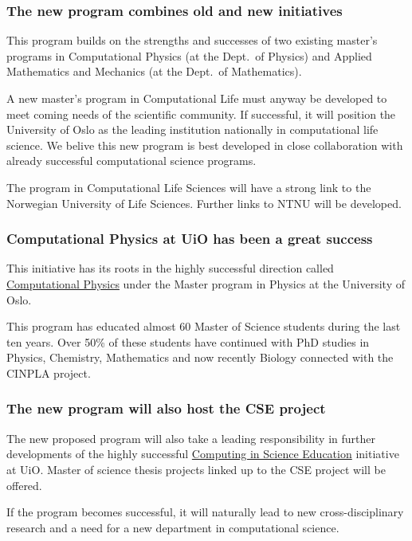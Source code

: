 \documentclass{beamer}
\begin{document}
\begin{frame}
\frametitle{The new program combines old and new initiatives}

\begin{block}{}

This program builds on the strengths and successes of two existing master's
programs in Computational Physics (at the Dept.~of Physics) and
Applied Mathematics and Mechanics (at the Dept.~of Mathematics).

A new master's program in Computational Life must anyway be developed to
meet coming needs of the scientific community. If successful, it will
position the University of Oslo as the leading institution
nationally in computational life science. We belive this new program is
best developed in close collaboration with already successful
computational science programs.

The program in Computational Life Sciences will have a strong
link to the Norwegian University of Life Sciences. Further links to
NTNU will be developed.
\end{block}
\end{frame}

\begin{frame}
\frametitle{Computational Physics at UiO has been a great success}

\begin{block}{}

This initiative has its roots in the highly successful direction called \href{{http://www.uio.no/english/studies/programmes/physics-master/programme-options/computational/index.html}}{Computational Physics}
under the Master program in Physics at the University of Oslo.

This program has educated almost 60 Master of Science students during
the last ten years.  Over 50\% of these students have continued with
PhD studies in Physics, Chemistry, Mathematics and now recently
Biology connected with the CINPLA project.

\end{block}
\end{frame}

\begin{frame}
\frametitle{The new program will also host the CSE project}

\begin{block}{}

The new proposed program will also take a leading responsibility in further
developments of the highly successful \href{{http://www.mn.uio.no/english/about/collaboration/cse/}}{Computing in Science Education} initiative at UiO.  Master of science thesis projects linked up to the CSE project will be offered.

If the program becomes successful, it will naturally lead to
new cross-disciplinary research and a need for a new department
in computational science.
\end{block}
\end{frame}
\end{document}
